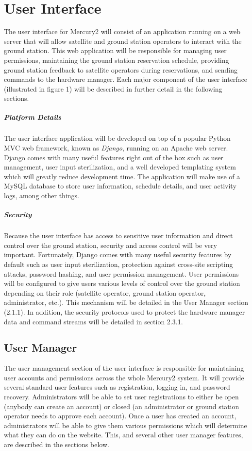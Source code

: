 \documentclass{mxl-design}
\begin{document}
\section{User Interface}
The user interface for Mercury2 will consist of an application running on a web server that will allow satellite and ground station operators to interact with the ground station. This web application will be responsible for managing user permissions, maintaining the ground station reservation schedule, providing ground station feedback to satellite operators during reservations, and sending commands to the hardware manager. Each major component of the user interface (illustrated in figure 1) will be described in further detail in the following sections.

\subparagraph{Platform Details}
The user interface application will be developed on top of a popular Python MVC web framework, known as \textit{Django}, running on an Apache web server. Django comes with many useful features right out of the box such as user management, user input sterilization, and a well developed templating system which will greatly reduce development time. The application will make use of a MySQL database to store user information, schedule details, and user activity logs, among other things.

\subparagraph{Security}
Because the user interface has access to sensitive user information and direct control over the ground station, security and access control will be very important. Fortunately, Django comes with many useful security features by default such as user input sterilization, protection against cross-site scripting attacks, password hashing, and user permission management. User permissions will be configured to give users various levels of control over the ground station depending on their role (satellite operator, ground station operator, administrator, etc.). This mechanism will be detailed in the User Manager section (2.1.1). In addition, the security protocols used to protect the hardware manager data and command streams will be detailed in section 2.3.1.

\subsection{User Manager}
The user management section of the user interface is responsible for maintaining user accounts and permissions across the whole Mercury2 system. It will provide several standard user features such as registration, logging in, and password recovery. Administrators will be able to set user registrations to either be open (anybody can create an account) or closed (an administrator or ground station operator needs to approve each account). Once a user has created an account, administrators will be able to give them various permissions which will determine what they can do on the website. This, and several other user manager features, are described in the sections below.
\end{document}
